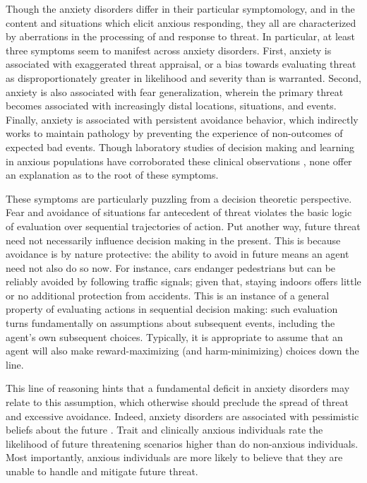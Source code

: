 \documentclass[11pt]{article} %
\begin{document}
Though the anxiety disorders differ in their particular symptomology, and in the content and situations which elicit anxious responding, they all are characterized by aberrations in the processing of and response to threat\citep{dsm5}. In particular, at least three symptoms seem to manifest across anxiety disorders. First, anxiety is associated with exaggerated threat appraisal, or a bias towards evaluating threat as disproportionately greater in likelihood and severity than is warranted\citep{ClarkBeck2011}. Second, anxiety is also associated with fear generalization, wherein the primary threat becomes associated with increasingly distal locations, situations, and events\citep{dymond2015}. Finally, anxiety is associated with persistent avoidance behavior, which indirectly works to maintain pathology by preventing the experience of non-outcomes of expected bad events\citep{Arnaudova2017}. Though laboratory studies of decision making and learning in anxious populations have corroborated these clinical observations \citep{Harle2017, norbury2018, Aylward2019}, none offer an explanation as to the root of these symptoms.

These symptoms are particularly puzzling from a decision theoretic perspective\citep{huys2015}. Fear and avoidance of situations far antecedent of threat violates the basic logic of evaluation over sequential trajectories of action. Put another way, future threat need not necessarily influence decision making in the present. This is because avoidance is by nature protective: the ability to avoid in future means an agent need not also do so now. For instance, cars endanger pedestrians but can be reliably avoided by following traffic signals; given that, staying indoors offers little or no additional protection from accidents. This is an instance of a general property of evaluating actions in sequential decision making: such evaluation turns fundamentally on assumptions about subsequent events, including the agent's own subsequent choices. Typically, it is appropriate to assume that an agent will also make reward-maximizing (and harm-minimizing) choices down the line.

This line of reasoning hints that a fundamental deficit in anxiety disorders may relate to this assumption, which otherwise should preclude the spread of threat and excessive avoidance. Indeed, anxiety disorders are associated with pessimistic beliefs about the future \citep{ClarkBeck2011}. Trait and clinically anxious individuals rate the likelihood of future threatening scenarios higher than do non-anxious individuals\citep{???}. Most importantly, anxious individuals are more likely to believe that they are unable to handle and mitigate future threat\citep{???}. 
\end{document}
